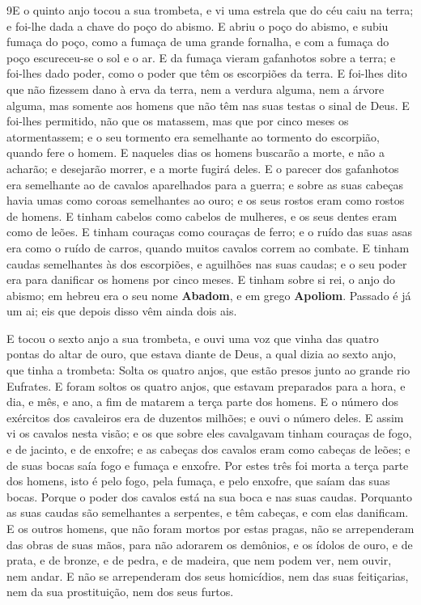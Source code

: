 \lettrine{9} E o quinto anjo tocou a sua trombeta, e vi uma
estrela que do céu caiu na terra; e foi-lhe dada a chave do poço do
abismo. E abriu o poço do abismo, e subiu fumaça do poço, como a
fumaça de uma grande fornalha, e com a fumaça do poço escureceu-se o
sol e o ar. E da fumaça vieram gafanhotos sobre a terra; e
foi-lhes dado poder, como o poder que têm os escorpiões da terra.
E foi-lhes dito que não fizessem dano à erva da terra, nem a
verdura alguma, nem a árvore alguma, mas somente aos homens que não
têm nas suas testas o sinal de Deus. E foi-lhes permitido, não
que os matassem, mas que por cinco meses os atormentassem; e o seu
tormento era semelhante ao tormento do escorpião, quando fere o
homem. E naqueles dias os homens buscarão a morte, e não a
acharão; e desejarão morrer, e a morte fugirá deles. E o parecer
dos gafanhotos era semelhante ao de cavalos aparelhados para a
guerra; e sobre as suas cabeças havia umas como coroas semelhantes
ao ouro; e os seus rostos eram como rostos de homens. E tinham
cabelos como cabelos de mulheres, e os seus dentes eram como de
leões. E tinham couraças como couraças de ferro; e o ruído das
suas asas era como o ruído de carros, quando muitos cavalos correm
ao combate. E tinham caudas semelhantes às dos escorpiões, e
aguilhões nas suas caudas; e o seu poder era para danificar os
homens por cinco meses. E tinham sobre si rei, o anjo do
abismo; em hebreu era o seu nome \textbf{Abadom}, e em grego
\textbf{Apoliom}. Passado é já um ai; eis que depois disso
vêm ainda dois ais.

E tocou o sexto anjo a sua trombeta, e ouvi uma voz que vinha das
quatro pontas do altar de ouro, que estava diante de Deus, a
qual dizia ao sexto anjo, que tinha a trombeta: Solta os quatro
anjos, que estão presos junto ao grande rio Eufrates. E foram
soltos os quatro anjos, que estavam preparados para a hora, e dia, e
mês, e ano, a fim de matarem a terça parte dos homens. E o
número dos exércitos dos cavaleiros era de duzentos milhões; e ouvi
o número deles. E assim vi os cavalos nesta visão; e os que
sobre eles cavalgavam tinham couraças de fogo, e de jacinto, e de
enxofre; e as cabeças dos cavalos eram como cabeças de leões; e de
suas bocas saía fogo e fumaça e enxofre. Por estes três foi
morta a terça parte dos homens, isto é pelo fogo, pela fumaça, e
pelo enxofre, que saíam das suas bocas. Porque o poder dos
cavalos está na sua boca e nas suas caudas. Porquanto as suas caudas
são semelhantes a serpentes, e têm cabeças, e com elas danificam.
E os outros homens, que não foram mortos por estas pragas,
não se arrependeram das obras de suas mãos, para não adorarem os
demônios, e os ídolos de ouro, e de prata, e de bronze, e de pedra,
e de madeira, que nem podem ver, nem ouvir, nem andar. E não
se arrependeram dos seus homicídios, nem das suas feitiçarias, nem
da sua prostituição, nem dos seus furtos.

